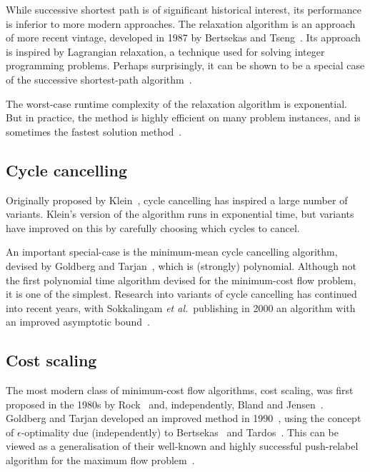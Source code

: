 While successive shortest path is of significant historical interest, its performance is inferior to more modern approaches. The relaxation algorithm is an approach of more recent vintage, developed in 1987 by Bertsekas and Tseng~\cite{BertsekasMethod:1988,BertsekasCodes:1988,BertsekasTseng:94}. Its approach is inspired by Lagrangian relaxation, a technique used for solving integer programming problems. Perhaps surprisingly, it can be shown to be a special case of the successive shortest-path algorithm~\cite[\S9.10]{Ahuja:1993}.

The worst-case runtime complexity of the relaxation algorithm is exponential. But in practice, the method is highly efficient on many problem instances, and is sometimes the fastest solution method~\cite{KiralyKovacs:2012}.

\subsection{Cycle cancelling}

Originally proposed by Klein~\cite{Klein:1967}, cycle cancelling has inspired a large number of variants. Klein's version of the algorithm runs in exponential time, but variants have improved on this by carefully choosing which cycles to cancel.

An important special-case is the minimum-mean cycle cancelling algorithm, devised by Goldberg and Tarjan~\cite{Goldberg:1989}, which is (strongly) polynomial. Although not the first polynomial time algorithm devised for the minimum-cost flow problem, it is one of the simplest. Research into variants of cycle cancelling has continued into recent years, with Sokkalingam \textit{et al.}\ publishing in 2000 an algorithm with an improved asymptotic bound~\cite{Sokkalingam:2000}.

\subsection{Cost scaling}

The most modern class of minimum-cost flow algorithms, cost scaling, was first proposed in the 1980s by Rock~\cite{Rock:1980} and, independently, Bland and Jensen~\cite{Bland:1985}. Goldberg and Tarjan developed an improved method in 1990~\cite{Goldberg:1990}, using the concept of $\epsilon$-optimality due (independently) to Bertsekas~\cite{Bertsekas:1979} and Tardos~\cite{Tardos:1985}. This can be viewed as a generalisation of their well-known and highly successful push-relabel algorithm for the maximum flow problem~\cite{Goldberg:1988}.

